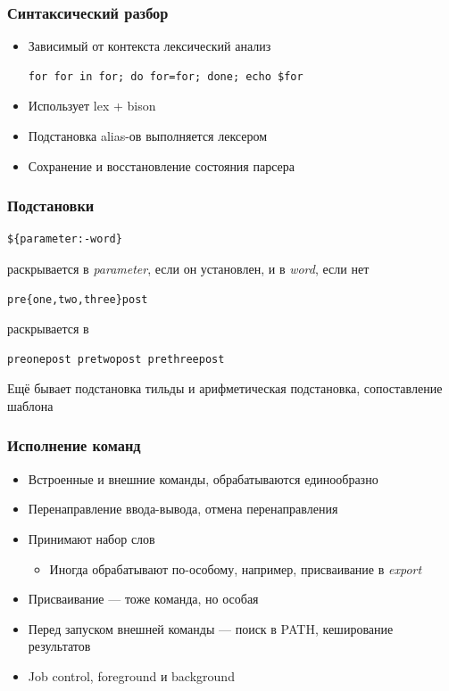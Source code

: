 \documentclass[xetex,mathserif,serif]{beamer}
\begin{document}
	\begin{frame}[fragile]
		\frametitle{Синтаксический разбор}
		\begin{itemize}
			\item Зависимый от контекста лексический анализ
				\begin{verbatim}
for for in for; do for=for; done; echo $for
				\end{verbatim}
			\item Использует lex + bison
			\item Подстановка alias-ов выполняется лексером
			\item Сохранение и восстановление состояния парсера
		\end{itemize}
	\end{frame}

	\begin{frame}[fragile]
		\frametitle{Подстановки}
		\begin{verbatim}
${parameter:-word}
		\end{verbatim}

раскрывается в \textit{parameter}, если он установлен, и в \textit{word}, если нет

		\begin{verbatim}
pre{one,two,three}post
		\end{verbatim}

раскрывается в 

		\begin{verbatim}
preonepost pretwopost prethreepost
		\end{verbatim}

		Ещё бывает подстановка тильды и арифметическая подстановка, сопоставление шаблона
	\end{frame}

	\begin{frame}[fragile]
		\frametitle{Исполнение команд}
		\begin{itemize}
			\item Встроенные и внешние команды, обрабатываются единообразно
			\item Перенаправление ввода-вывода, отмена перенаправления
			\item Принимают набор слов
			\begin{itemize}
				\item Иногда обрабатывают по-особому, например, присваивание в \textit{export}
			\end{itemize}
			\item Присваивание --- тоже команда, но особая
			\item Перед запуском внешней команды --- поиск в PATH, кеширование результатов
			\item Job control, foreground и background
		\end{itemize}
	\end{frame}
\end{document}
